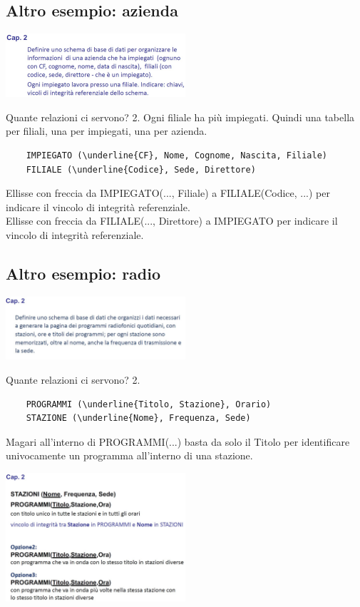 \subsection{Altro esempio: azienda}
\begin{center}
    \includegraphics[width=0.5\textwidth]{img/MR_es_azienda1.jpg}
\end{center}
Quante relazioni ci servono? 2. Ogni filiale ha più impiegati. Quindi una tabella per filiali, una per impiegati, una per azienda.
\begin{verbatim}
    IMPIEGATO (\underline{CF}, Nome, Cognome, Nascita, Filiale)
    FILIALE (\underline{Codice}, Sede, Direttore)
\end{verbatim}
Ellisse con freccia da IMPIEGATO(..., Filiale) a FILIALE(Codice, ...) per indicare il vincolo di integrità referenziale.
\\Ellisse con freccia da FILIALE(..., Direttore) a IMPIEGATO per indicare il vincolo di integrità referenziale.

\subsection{Altro esempio: radio}
\begin{center}
    \includegraphics[width=0.5\textwidth]{img/MR_es_radio1.jpg}
\end{center}
Quante relazioni ci servono? 2.
\begin{verbatim}
    PROGRAMMI (\underline{Titolo, Stazione}, Orario) 
    STAZIONE (\underline{Nome}, Frequenza, Sede)
\end{verbatim}
Magari all'interno di PROGRAMMI(...) basta da solo il Titolo per identificare univocamente un programma all'interno di una stazione.
\begin{center}
    \includegraphics[width=0.5\textwidth]{img/MR_es_radio2.jpg}
\end{center}

